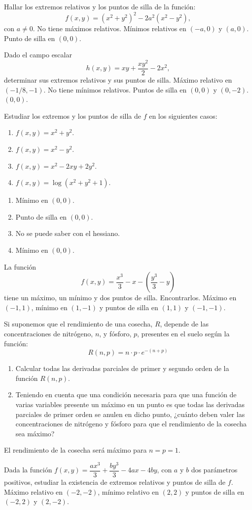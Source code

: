 
{Hallar los extremos relativos y los puntos de silla de la función:
\[
f(x,y) = (x^2+y^2)^2-2a^2(x^2-y^2),
\]
con $a\neq 0$.
}
{No tiene máximos relativos. Mínimos relativos en $(-a,0)$ y $(a,0)$. Punto de silla en $(0,0)$.
}
{
}


{Dado el campo escalar
\[
h(x,y) = xy+\frac{xy^2}{2}-2x^2,
\]
determinar sus extremos relativos y sus puntos de silla.
}
{Máximo relativo en $(-1/8,-1)$. No tiene mínimos relativos. Puntos de silla en $(0,0)$ y $(0,-2)$.
$(0,0)$.
}
{
}

{Estudiar los extremos y los puntos de silla de $f$ en los siguientes casos:
\begin{enumerate}
\item $f(x,y) = x^2+y^2$.
\item $f(x,y) = x^2-y^2$.
\item $f(x,y) = x^2-2xy+2y^2$.
\item $f(x,y) = \log(x^2+y^2+1)$.
\end{enumerate}
}
{\begin{enumerate}
\item Mínimo en $(0,0)$.
\item Punto de silla en $(0,0)$.
\item No se puede saber con el hessiano.
\item Mínimo en $(0,0)$.
\end{enumerate}
}
{
}


{La función
\[
f(x,y) = \frac{x^3}{3}-x-\left(\frac{y^3}{3}-y\right)
\]
tiene un máximo, un mínimo y dos puntos de silla. Encontrarlos.
}
{Máximo en $(-1,1)$, mínimo en $(1,-1)$ y puntos de silla en $(1,1)$ y $(-1,-1)$.
}
{
}


{Si suponemos que el rendimiento de una cosecha, $R$, depende de las concentraciones de nitrógeno, $n$, y fósforo, $p$, presentes en el suelo según la función:
\[
R(n,p) = n \cdot p \cdot e^{ - (n + p)}
\]
\begin{enumerate}
\item Calcular todas las derivadas parciales de primer y segundo orden de la función $R(n,p)$.
\item Teniendo en cuenta que una condición necesaria para que una función de varias variables presente un máximo en un
punto es que todas las derivadas parciales de primer orden se anulen en dicho punto, ¿cuánto deben valer las
concentraciones de nitrógeno y fósforo para que el rendimiento de la cosecha sea máximo?
\end{enumerate}
}
{El rendimiento de la cosecha será máximo para $n=p=1$.
}
{
}


{Dada la función $f(x,y)=\dfrac{ax^3}{3} + \dfrac{by^3}{3}-4ax-4by$, con $a$ y $b$ dos parámetros positivos, estudiar la existencia de extremos relativos y puntos de silla de $f$.
}
{Máximo relativo en $(-2,-2)$, mínimo relativo en $(2,2)$ y puntos de silla en $(-2,2)$ y $(2,-2)$.
}
{
}
